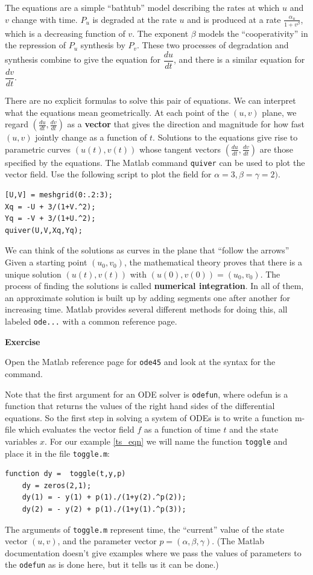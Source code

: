 \documentclass [11pt]{article}
\newcounter{exercise}
\numberwithin{exercise}{section}
\newcommand{\exnumber}{\addtocounter{exercise}{1} \theexercise \thinspace}
\begin{document}
The equations are a simple ``bathtub'' model describing the rates at which $u$ and $v$ change with
time. $P_u$ is degraded at the rate $u$ and is
produced at a rate $\frac{\alpha_u}{1+v^\beta}$, which is a decreasing
function of $v$. The exponent $\beta$ models the ``cooperativity'' in
the repression of $P_u$ synthesis by $P_v$. These two processes of
degradation and synthesis combine to give the equation for $\dfrac{du}{dt}$, and 
there is a similar equation for $\dfrac{dv}{dt}$.

There are no explicit formulas to solve this pair of equations. We can
interpret what the equations mean geometrically. At each point of the
$(u,v)$ plane, we regard $ (\frac{du}{dt},\frac{dv}{dt})$ as a {\bf
vector} that gives the direction and magnitude for how fast $(u,v)$
jointly change as a function of $t$. Solutions to the equations give
rise to parametric curves $(u(t),v(t))$ whose tangent vectors $
(\frac{du}{dt},\frac{dv}{dt})$ are those specified by the equations.
The Matlab command \texttt{quiver} can be used to plot the vector
field.  Use the following script to plot the field
for $\alpha = 3, \beta = \gamma = 2)$.
\begin{verbatim}
[U,V] = meshgrid(0:.2:3);
Xq = -U + 3/(1+V.^2);
Yq = -V + 3/(1+U.^2);
quiver(U,V,Xq,Yq);
\end{verbatim}

We can think of the solutions as curves in the plane that ``follow the arrows''
Given a starting point $(u_0,v_0)$, the mathematical theory proves that there 
is a unique solution $(u(t),v(t))$ with $(u(0),v(0))=(u_0,v_0)$. The process
of finding the solutions is called {\bf numerical integration}. In all of 
them, an approximate solution is built up by adding segments one after 
another for increasing time. Matlab provides several different methods for 
doing this, all labeled \texttt{ode...} with a common reference page. 

{\bf Exercise \exnumber} Open the Matlab reference page for \texttt{ode45} and look at the 
syntax for the command. 

Note that the first argument for an ODE solver is \texttt{odefun}, where odefun
is a function that returns the values of the right hand sides of the 
differential equations. So the first step in solving a system of ODEs is to write
a function m-file which evaluates the vector field $f$ as a function of 
time $t$ and the state variables $x$. For our example \eqref{ts_eqn}
we will name the function \texttt{toggle} and place it in the file 
\texttt{toggle.m}:
\begin{verbatim}
function dy =  toggle(t,y,p)
    dy = zeros(2,1);
    dy(1) = - y(1) + p(1)./(1+y(2).^p(2));
    dy(2) = - y(2) + p(1)./(1+y(1).^p(3));
\end{verbatim}
The arguments of \texttt{toggle.m} represent time, the ``current'' value of the state
vector $(u,v)$, and the parameter vector $p = (\alpha,\beta,\gamma)$. 
(The Matlab documentation doesn't give examples where we pass the values of 
parameters to the \texttt{odefun} as is done here, but it tells us it can be done.)
\end{document}
